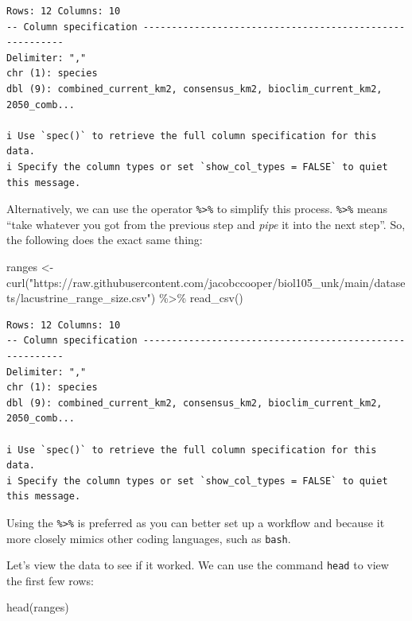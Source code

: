 \documentclass[
  letterpaper,
  DIV=11,
  numbers=noendperiod]{scrreprt}
\newenvironment{Shaded}{\begin{snugshade}}{\end{snugshade}}
\newcommand{\FunctionTok}[1]{\textcolor[rgb]{0.28,0.35,0.67}{#1}}
\newcommand{\NormalTok}[1]{\textcolor[rgb]{0.00,0.23,0.31}{#1}}
\newcommand{\OtherTok}[1]{\textcolor[rgb]{0.00,0.23,0.31}{#1}}
\newcommand{\SpecialCharTok}[1]{\textcolor[rgb]{0.37,0.37,0.37}{#1}}
\newcommand{\StringTok}[1]{\textcolor[rgb]{0.13,0.47,0.30}{#1}}
\begin{document}
\begin{verbatim}
Rows: 12 Columns: 10
-- Column specification --------------------------------------------------------
Delimiter: ","
chr (1): species
dbl (9): combined_current_km2, consensus_km2, bioclim_current_km2, 2050_comb...

i Use `spec()` to retrieve the full column specification for this data.
i Specify the column types or set `show_col_types = FALSE` to quiet this message.
\end{verbatim}

Alternatively, we can use the operator \texttt{\%\textgreater{}\%} to
simplify this process. \texttt{\%\textgreater{}\%} means ``take whatever
you got from the previous step and \emph{pipe} it into the next step''.
So, the following does the exact same thing:

\begin{Shaded}
\begin{Highlighting}[]
\NormalTok{ranges }\OtherTok{\textless{}{-}} \FunctionTok{curl}\NormalTok{(}\StringTok{"https://raw.githubusercontent.com/jacobccooper/biol105\_unk/main/datasets/lacustrine\_range\_size.csv"}\NormalTok{) }\SpecialCharTok{\%\textgreater{}\%}
  \FunctionTok{read\_csv}\NormalTok{()}
\end{Highlighting}
\end{Shaded}

\begin{verbatim}
Rows: 12 Columns: 10
-- Column specification --------------------------------------------------------
Delimiter: ","
chr (1): species
dbl (9): combined_current_km2, consensus_km2, bioclim_current_km2, 2050_comb...

i Use `spec()` to retrieve the full column specification for this data.
i Specify the column types or set `show_col_types = FALSE` to quiet this message.
\end{verbatim}

Using the \texttt{\%\textgreater{}\%} is preferred as you can better set
up a workflow and because it more closely mimics other coding languages,
such as \texttt{bash}.

Let's view the data to see if it worked. We can use the command
\texttt{head} to view the first few rows:

\begin{Shaded}
\begin{Highlighting}[]
\FunctionTok{head}\NormalTok{(ranges)}
\end{Highlighting}
\end{Shaded}
\end{document}
